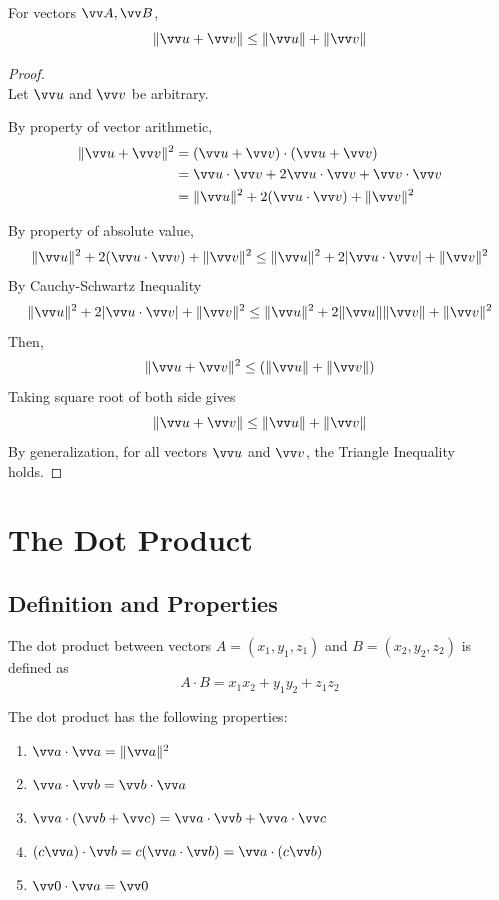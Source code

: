 \begin{theorem}
For vectors $\vv A, \vv B$,
$$
\norm{\vv u + \vv v} \leq \norm{\vv u} + \norm{\vv v}
$$

\begin{proof}
    \hfill \\
    Let $\vv u$ and $\vv v$ be arbitrary.
        
    By property of vector arithmetic,
    \begin{align*}
        \norm{\vv u + \vv v}^2 &= (\vv u + \vv v)\cdot (\vv u + \vv v) \\
        &= \vv u \cdot \vv v + 2\vv u \cdot \vv v + \vv v \cdot \vv v \\
        &= \norm{\vv u}^2 + 2(\vv u \cdot \vv v) + \norm{\vv v}^2
    \end{align*}

    By property of absolute value,
    $$
    \norm{\vv u}^2 + 2(\vv u \cdot \vv v) + \norm{\vv v}^2 \leq \norm{\vv u}^2 + 2 |\vv u \cdot \vv v| + \norm{\vv v}^2
    $$
    By Cauchy-Schwartz Inequality
    $$
    \norm{\vv u}^2 + 2 |\vv u \cdot \vv v| + \norm{\vv v}^2 \leq \norm{\vv u}^2 + 2 \norm{\vv u}\norm{\vv v} + \norm{\vv v}^2
    $$
    Then,
    $$
    \norm{\vv u + \vv v}^2 \leq (\norm{\vv u}+\norm{\vv v})
    $$
    Taking square root of both side gives
    $$
    \norm{\vv u + \vv v} \leq \norm{\vv u} + \norm{\vv v}
    $$
    By generalization, for all vectors $\vv u$ and $\vv v$, the Triangle Inequality holds.
\end{proof}
\end{theorem}


\section{The Dot Product}
\subsection{Definition and Properties}

\begin{definition}
The dot product between vectors $A=(x_1,y_1,z_1)$ and $B=(x_2,y_2,z_2)$ is defined as
$$
A \cdot B = x_1x_2+y_1y_2+z_1z_2
$$
\end{definition}

The dot product has the following properties:
\begin{multicols}{2}
\begin{enumerate}
    \item $\vv a \cdot \vv a = \norm{\vv a}^2$
    \item $\vv a \cdot \vv b = \vv b \cdot \vv a$
    \item $\vv a \cdot (\vv b+\vv c) = \vv a\cdot \vv b+ \vv a \cdot \vv c$
    \item $(c\vv a)\cdot \vv b= c(\vv a\cdot \vv b)=\vv a\cdot(c\vv b)$
    \item $\vv 0 \cdot \vv a = \vv 0$
\end{enumerate}
\end{multicols}

